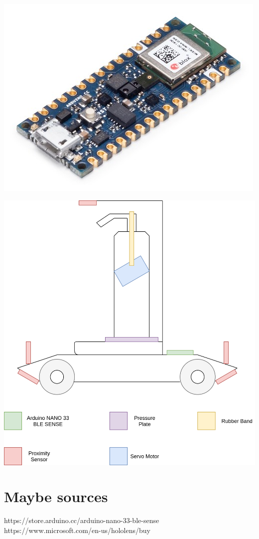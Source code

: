 \documentclass{article}
\begin{document}
\includegraphics[width=\linewidth]{img/abx00031_iso_1.jpg}

\includegraphics[width=\linewidth]{img/prototype-drawing.png}

\section{Maybe sources}

https://store.arduino.cc/arduino-nano-33-ble-sense\\
https://www.microsoft.com/en-us/hololens/buy
\end{document}
